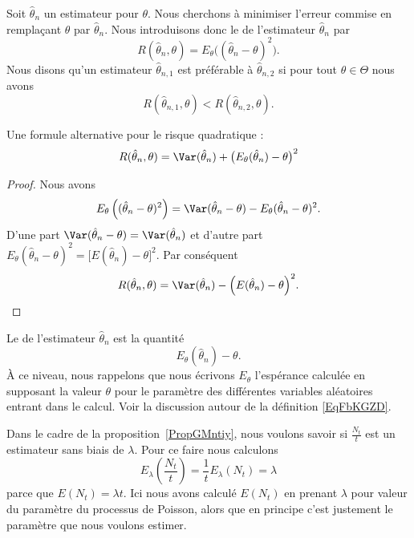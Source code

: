 Soit \( \hat\theta_n\) un estimateur pour \( \theta\). Nous cherchons à minimiser l'erreur commise en remplaçant \( \theta\) par \( \hat\theta_n\). Nous introduisons donc le  de l'estimateur \( \hat\theta_n\) par
\begin{equation}
    R(\hat\theta_n,\theta)=E_{\theta}\big( (\hat\theta_n-\theta)^2 \big).
\end{equation}
Nous disons qu'un estimateur \( \hat\theta_{n,1}\) est préférable à \( \hat\theta_{n,2}\) si pour tout \( \theta\in\Theta\) nous avons
\begin{equation}
    R(\hat\theta_{n,1},\theta)<R(\hat\theta_{n,2},\theta).
\end{equation}

\begin{lemma}
    Une formule alternative pour le risque quadratique :
    \begin{equation}
        R(\hat\theta_n,\theta)=\Var(\hat\theta_n)+\big( E_{\theta}(\hat\theta_n)-\theta \big)^2
    \end{equation}
\end{lemma}

\begin{proof}
    Nous avons
    \begin{equation}
        E_{\theta}\left( (\hat\theta_n-\theta)^2 \right)=\Var(\hat\theta_n-\theta)-E_{\theta}(\hat\theta_n-\theta)^2.
    \end{equation}
    D'une part \( \Var(\hat\theta_n-\theta)=\Var(\hat\theta_n)\) et d'autre part \( E_{\theta}(\hat\theta_n-\theta)^2=\big[ E(\hat\theta_n)-\theta \big]^2\). Par conséquent
    \begin{equation}    \label{EqRisqueetbaisiVar}
        R(\hat\theta_n,\theta)=\Var(\hat\theta_n)-\Big( E(\hat\theta_n)-\theta \Big)^2.
    \end{equation}
\end{proof}

Le  de l'estimateur \( \hat\theta_n\) est la quantité
\begin{equation}
    E_{\theta}(\hat\theta_n)-\theta.
\end{equation}
À ce niveau, nous rappelons que nous écrivons \( E_{\theta}\) l'espérance calculée en supposant la valeur \( \theta\) pour le paramètre des différentes variables aléatoires entrant dans le calcul. Voir la discussion autour de la définition \eqref{EqFbKGZD}.

\begin{example}     \label{ExytNlTq}
    Dans le cadre de la proposition~\ref{PropGMntiy}, nous voulons savoir si \( \frac{ N_t }{ t }\) est un estimateur sans biais de \( \lambda\). Pour ce faire nous calculons
    \begin{equation}
        E_{\lambda}\left( \frac{ N_t }{ t } \right)=\frac{1}{ t }E_{\lambda}(N_t)=\lambda
    \end{equation}
    parce que \( E(N_t)=\lambda t\). Ici nous avons calculé \( E(N_t)\) en prenant \( \lambda\) pour valeur du paramètre du processus de Poisson, alors que en principe c'est justement le paramètre que nous voulons estimer.
\end{example}

